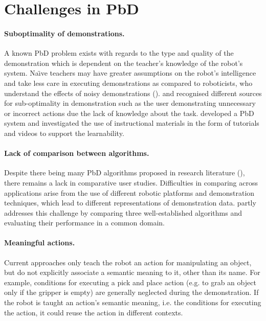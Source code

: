 \section{Challenges in PbD}\label{sssec:Challenges in PbD}

\paragraph{Suboptimality of demonstrations.}
A known PbD problem exists with regards to the type and quality of the demonstration which is dependent on the teacher's knowledge of the robot's system.
Na\"{\i}ve teachers may have greater assumptions on the robot's intelligence and take less care in executing demonstrations as compared to roboticists, who understand the effects of noisy demonstrations (\cite{suay2012practical}).
\cite{chen2003programing} and \cite{kaiser1995obtaining} recognised different sources for sub-optimality in demonstration such as the user demonstrating unnecessary or incorrect actions due the lack of knowledge about the task.
\cite{cakmak2014teaching} developed a PbD system and investigated the use of instructional materials in the form of tutorials and videos to support the learnability.

\paragraph{Lack of comparison between algorithms.}
Despite there being many PbD algorithms proposed in research literature (\cite{argall2009survey,billing2010formalism}), there remains a lack in comparative user studies.
Difficulties in comparing across applications arise from the use of different robotic platforms and demonstration techniques, which lead to different representations of demonstration data.
\cite{suay2012practical} partly addresses this challenge by comparing three well-established algorithms and evaluating their performance in a common domain.

\paragraph{Meaningful actions.}
Current approaches only teach the robot an action for manipulating an object, but do not explicitly associate a semantic meaning to it, other than its name.
For example, conditions for executing a pick and place action (e.g. to grab an object only if the gripper is empty) are generally neglected during the demonstration.
If the robot is taught an action's semantic meaning, i.e. the conditions for executing the action, it could reuse the action in different contexts.

